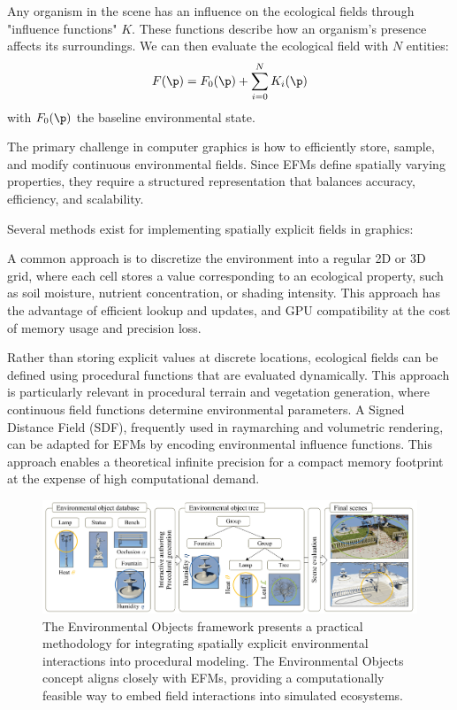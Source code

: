 Any organism in the scene has an influence on the ecological fields through "influence functions" $K$. These functions describe how an organism's presence affects its surroundings. We can then evaluate the ecological field with $N$ entities:
\begin{align}
    \label{eq:env-obj_eco-field-computation}
    F(\p) = F_0(\p) + \sum_{i=0}^{N}{K_i(\p)} 
\end{align}
with $F_0(\p)$ the baseline environmental state.




The primary challenge in computer graphics is how to efficiently store, sample, and modify continuous environmental fields. Since EFMs define spatially varying properties, they require a structured representation that balances accuracy, efficiency, and scalability.

Several methods exist for implementing spatially explicit fields in graphics:
\begin{Itemize}
    \Item{} A common approach is to discretize the environment into a regular 2D or 3D grid, where each cell stores a value corresponding to an ecological property, such as soil moisture, nutrient concentration, or shading intensity. This approach has the advantage of efficient lookup and updates, and GPU compatibility at the cost of memory usage and precision loss. 

    \Item{} Rather than storing explicit values at discrete locations, ecological fields can be defined using procedural functions that are evaluated dynamically. This approach is particularly relevant in procedural terrain and vegetation generation, where continuous field functions determine environmental parameters. A Signed Distance Field (SDF), frequently used in raymarching and volumetric rendering, can be adapted for EFMs by encoding environmental influence functions. This approach enables a theoretical infinite precision for a compact memory footprint at the expense of high computational demand.
\end{Itemize}




\begin{figure}[H]
    \centering
    \includegraphics[width = .8 \linewidth]{env-objs-Grosbellet2016.png}
    \caption{The Environmental Objects framework \cite{Grosbellet2016} presents a practical methodology for integrating spatially explicit environmental interactions into procedural modeling. The Environmental Objects concept aligns closely with EFMs, providing a computationally feasible way to embed field interactions into simulated ecosystems.}
    \label{fig:env-obj_teaser-grosbellet2016}
\end{figure}

